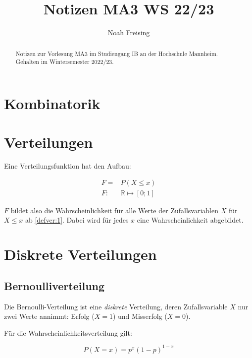 \documentclass{tufte-handout}
\title{Notizen MA3 WS 22/23}
\author[Noah Freising]{Noah Freising}
\theoremstyle{own}
\begin{document}
\maketitle%

\begin{abstract}
\noindent
Notizen zur Vorlesung MA3 im Studiengang IB an der Hochschule Mannheim. Gehalten im Wintersemester 2022/23.
\end{abstract}

{\small\tableofcontents}


\section{Kombinatorik}

\section{Verteilungen}

Eine Verteilungsfunktion hat den Aufbau:

\begin{align}
F = & P(X \leq x) \label{defver:1} \\ 
F  :&  \mathbb{R} \mapsto [0;1] \label{defver:2}
\end{align}

$F$ bildet also die Wahrscheinlichkeit für alle Werte der Zufallsvariablen $X$ für $X \leq x$ ab \eqref{defver:1}. Dabei wird für jedes $x$ eine Wahrscheinlichkeit abgebildet.

\section{Diskrete Verteilungen}

\subsection{Bernoulliverteilung}

Die Bernoulli-Verteilung ist eine \textit{diskrete} Verteilung, deren Zufallsvariable $X$ nur zwei Werte annimmt: Erfolg ($X=1$) und Misserfolg ($X=0$).

Für die Wahrscheinlichkeitsverteilung gilt:

\begin{equation}
	P(X=x) = p^x (1-p)^{1-x}
\end{equation}
\end{document}
